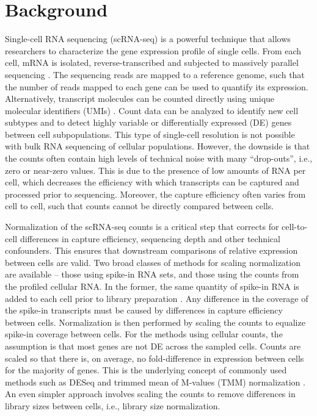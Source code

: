 \documentclass{bmcart}
\begin{document}
\section*{Background}
Single-cell RNA sequencing (scRNA-seq) is a powerful technique that allows researchers to characterize the gene expression profile of single cells.
From each cell, mRNA is isolated, reverse-transcribed and subjected to massively parallel sequencing \cite{stegle2015computational}.
The sequencing reads are mapped to a reference genome, such that the number of reads mapped to each gene can be used to quantify its expression.
Alternatively, transcript molecules can be counted directly using unique molecular identifiers (UMIs) \cite{islam2014quantitative}.
Count data can be analyzed to identify new cell subtypes and to detect highly variable or differentially expressed (DE) genes between cell subpopulations.
This type of single-cell resolution is not possible with bulk RNA sequencing of cellular populations.
However, the downside is that the counts often contain high levels of technical noise with many ``drop-outs'', i.e., zero or near-zero values.
This is due to the presence of low amounts of RNA per cell, which decreases the efficiency with which transcripts can be captured and processed prior to sequencing.
Moreover, the capture efficiency often varies from cell to cell, such that counts cannot be directly compared between cells.

Normalization of the scRNA-seq counts is a critical step that corrects for cell-to-cell differences in capture efficiency, sequencing depth and other technical confounders.
This ensures that downstream comparisons of relative expression between cells are valid.
Two broad classes of methods for scaling normalization are available -- those using spike-in RNA sets, and those using the counts from the profiled cellular RNA.
In the former, the same quantity of spike-in RNA is added to each cell prior to library preparation \cite{stegle2015computational}.
Any difference in the coverage of the spike-in transcripts must be caused by differences in capture efficiency between cells.
Normalization is then performed by scaling the counts to equalize spike-in coverage between cells.
For the methods using cellular counts, the assumption is that most genes are not DE across the sampled cells.
Counts are scaled so that there is, on average, no fold-difference in expression between cells for the majority of genes.
This is the underlying concept of commonly used methods such as DESeq \cite{anders2010differential} and trimmed mean of M-values (TMM) normalization \cite{robinson2010scaling}.
An even simpler approach involves scaling the counts to remove differences in library sizes between cells, i.e., library size normalization.
\end{document}

